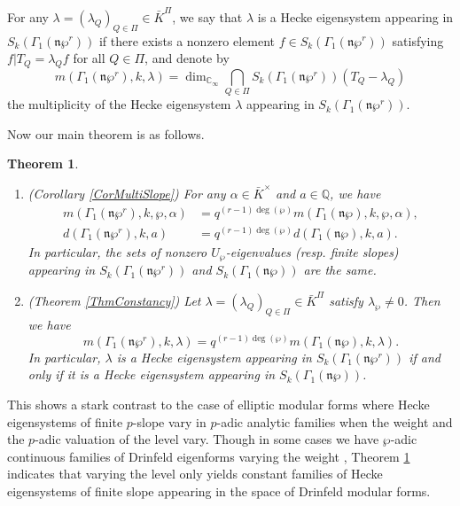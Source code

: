 \documentclass[11pt]{amsart}
\theoremstyle{plain}
\newtheorem{thm}{Theorem}[section]
\theoremstyle{definition}
\newcommand{\bQ}{\mathbb{Q}}
\newcommand{\frn}{\mathfrak{n}}
\newcommand{\Cinf}{\mathbb{C}_{\infty}}
\begin{document}
For any $
\lambda=(\lambda_Q)_{Q\in \Pi}\in \bar{K}^\Pi$, we say that $\lambda$ is a Hecke eigensystem appearing in $S_k(\Gamma_1(\frn\wp^r))$
if there exists a nonzero element $f\in S_k(\Gamma_1(\frn\wp^r))$ satisfying $f|T_Q=\lambda_Q f$ for all $Q\in \Pi$, and denote by 
\[
m(\Gamma_1(\frn\wp^r),k,\lambda)=\dim_{\Cinf}\bigcap_{Q\in \Pi} S_k(\Gamma_1(\frn\wp^r))(T_Q-\lambda_Q)
\]
the multiplicity of the Hecke eigensystem $\lambda$ appearing in $S_k(\Gamma_1(\frn\wp^r))$.

Now our main theorem is as follows.

\begin{thm}\label{ThmMainIntro}
	\begin{enumerate}
		\item\label{ThmMainIntro_Slope}(Corollary \ref{CorMultiSlope}) For any $\alpha\in \bar{K}^\times$ and $a\in \bQ$, we have
		\[
		\begin{aligned}
			m(\Gamma_1(\frn\wp^r),k,\wp,\alpha)&=q^{(r-1)\deg(\wp)}m(\Gamma_1(\frn\wp),k,\wp,\alpha),\\
			d(\Gamma_1(\frn\wp^r),k,a)&=q^{(r-1)\deg(\wp)}d(\Gamma_1(\frn\wp),k,a).
		\end{aligned}
		\]
		In particular, the sets of nonzero $U_\wp$-eigenvalues ({\textit resp.} finite slopes) appearing in $S_k(\Gamma_1(\frn\wp^r))$ and $S_k(\Gamma_1(\frn\wp))$ 
		are the same.
		\item\label{ThmMainIntro_Eigensys}(Theorem \ref{ThmConstancy}) Let $\lambda=(\lambda_Q)_{Q\in\Pi}\in \bar{K}^\Pi$ satisfy $\lambda_\wp\neq 0$. Then 
		we have
		\[
		m(\Gamma_1(\frn\wp^r),k,\lambda)=q^{(r-1)\deg(\wp)}m(\Gamma_1(\frn\wp),k,\lambda).
		\]
		In particular, $\lambda$ is a Hecke eigensystem appearing in $S_k(\Gamma_1(\frn\wp^r))$ if and only if it is a Hecke eigensystem appearing in 
		$S_k(\Gamma_1(\frn\wp))$.
	\end{enumerate}
\end{thm}

This shows a stark contrast to the case of elliptic modular forms where Hecke eigensystems of finite $p$-slope vary in $p$-adic analytic families 
when the weight and the $p$-adic valuation of the level vary. Though in some cases we have $\wp$-adic continuous families of Drinfeld eigenforms
varying the weight \cite{Ha_DMBF}, Theorem \ref{ThmMainIntro} indicates that varying the level only yields constant families of Hecke eigensystems
of finite slope appearing in the space of Drinfeld modular forms.
\end{document}
